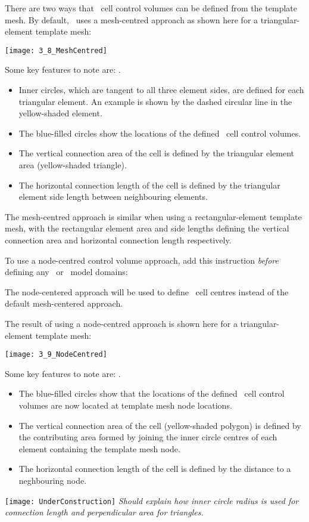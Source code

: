 There are two ways that \mf\ cell control volumes can be defined from the template mesh.  By default, \mut\ uses a mesh-centred approach as shown here for a triangular-element template mesh:

    \texttt{[image: 3\_8\_MeshCentred]}

Some key features to note are:
    \label{page:MeshCentredApproach}
    \label{page:MeshCentredApproach}.
\begin{itemize}
    \item Inner circles, which are tangent to all three element sides, are defined for each triangular element.  An example is shown by the dashed circular line in the yellow-shaded element.
    \item The blue-filled circles show the locations of the defined \mf\ cell control volumes.
    \item The vertical connection area of the cell is defined by the triangular element area (yellow-shaded triangle).
    \item The horizontal connection length of the cell is defined by the triangular element side length between neighbouring elements.
\end{itemize}

The mesh-centred approach is similar when using a  rectangular-element template mesh, with the rectangular element area and side lengths defining the vertical connection area and horizontal connection length respectively.

To use a node-centred control volume approach, add this instruction {\em before} defining any \gwf\ or \swf\ model domains:

    {The node-centered approach will be used to define \mf\ cell centres instead of the default mesh-centered approach.
     }

The result of using a node-centred approach is shown here for a triangular-element template mesh:

    \texttt{[image: 3\_9\_NodeCentred]}

Some key features to note are:
    \label{page:NodeCentredApproach}
    \label{page:NodeCentredApproach}.
\begin{itemize}
    \item The blue-filled circles show that the locations of the defined \mf\ cell control volumes are now located at template mesh node locations.
    \item The vertical connection area of the cell (yellow-shaded polygon) is defined by the contributing area formed by joining the inner circle centres of each element containing the template mesh node.         \label{page:NodeCentredApproach}
    \item The horizontal connection length of the cell is defined by the distance to a neghbouring node.
\end{itemize}

\texttt{[image: UnderConstruction]} \textit{Should explain how inner circle radius is used for connection length and perpendicular area for triangles.}



